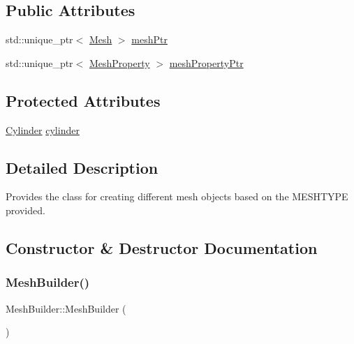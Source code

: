 \subsection*{Public Attributes}
\begin{DoxyCompactItemize}
\item 
std\+::unique\+\_\+ptr$<$ \mbox{\hyperlink{class_mesh}{Mesh}} $>$ \mbox{\hyperlink{class_mesh_builder_ad15d79cf6c25b3381e4628f77adc099a}{mesh\+Ptr}}
\item 
std\+::unique\+\_\+ptr$<$ \mbox{\hyperlink{class_mesh_property}{Mesh\+Property}} $>$ \mbox{\hyperlink{class_mesh_builder_a0c1493d189b81576c0740cc9a9373dc1}{mesh\+Property\+Ptr}}
\end{DoxyCompactItemize}
\subsection*{Protected Attributes}
\begin{DoxyCompactItemize}
\item 
\mbox{\hyperlink{class_cylinder}{Cylinder}} \mbox{\hyperlink{class_mesh_builder_aba5364c12c71c36af6a83b6c3853af5b}{cylinder}}
\end{DoxyCompactItemize}


\subsection{Detailed Description}
Provides the class for creating different mesh objects based on the M\+E\+S\+H\+T\+Y\+PE provided. 

\subsection{Constructor \& Destructor Documentation}
\mbox{\label{class_mesh_builder_a13fe22fd14a85f789dc9d7d4a8d2419d}} 
\subsubsection{\texorpdfstring{MeshBuilder()}{MeshBuilder()}\hspace{0.1cm}{\footnotesize\ttfamily [1/3]}}
{\footnotesize\ttfamily Mesh\+Builder\+::\+Mesh\+Builder (\begin{DoxyParamCaption}{ }\end{DoxyParamCaption})}

